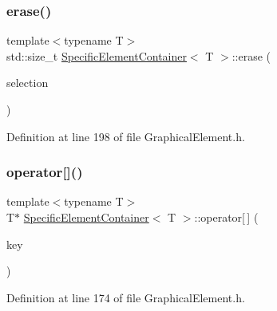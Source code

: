 \subsubsection{\texorpdfstring{erase()}{erase()}\hspace{0.1cm}{\footnotesize\ttfamily [2/2]}}
{\footnotesize\ttfamily template$<$typename T$>$ \\
std\+::size\+\_\+t \hyperlink{class_specific_element_container}{Specific\+Element\+Container}$<$ T $>$\+::erase (\begin{DoxyParamCaption}\item[{const \hyperlink{struct_selection}{Selection} \&}]{selection }\end{DoxyParamCaption})\hspace{0.3cm}{\ttfamily [inline]}}



Definition at line 198 of file Graphical\+Element.\+h.

\mbox{\label{class_specific_element_container_ae61c1d81ff22ca1bb4d37f0917710a4b}} 
\subsubsection{\texorpdfstring{operator[]()}{operator[]()}\hspace{0.1cm}{\footnotesize\ttfamily [1/2]}}
{\footnotesize\ttfamily template$<$typename T$>$ \\
T$\ast$ \hyperlink{class_specific_element_container}{Specific\+Element\+Container}$<$ T $>$\+::operator\mbox{[}$\,$\mbox{]} (\begin{DoxyParamCaption}\item[{const \hyperlink{_graphical_element_8h_ade5fd6c85839a416577ff9de1605141e}{Element\+Key} \&}]{key }\end{DoxyParamCaption})\hspace{0.3cm}{\ttfamily [inline]}}



Definition at line 174 of file Graphical\+Element.\+h.

\mbox{\label{class_specific_element_container_a6a024841f2b43dc4e3c467d401434d28}} 
